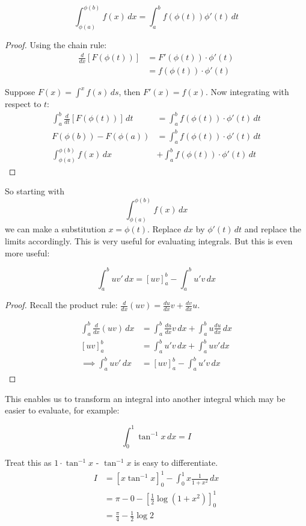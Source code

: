 \documentclass[twoside]{scrartcl}
\begin{document}
\begin{theorem}
 \[\int_{\phi(a)}^{\phi(b)} f(x)\,dx = \int_a^b f(\phi(t))\phi'(t)\,dt\]
\end{theorem}
\begin{proof}
Using the chain rule: 
\[
\begin{aligned}
  \frac{d}{dx}\left[F(\phi(t))\right] &= F'(\phi(t))\cdot\phi'(t)\\
  &= f(\phi(t))\cdot\phi'(t)
\end{aligned}
\]

Suppose $F(x) = \int^x f(s)\,ds$, then $F'(x) = f(x)$. Now integrating with respect to $t$: 
\[
\begin{aligned}
  \int_a^b \frac{d}{dt}\left[F(\phi(t))\right]\,dt &= \int_a^b f(\phi(t))\cdot\phi'(t)\,dt\\
  F(\phi(b)) - F(\phi(a)) &= \int_a^b f(\phi(t))\cdot\phi'(t)\,dt\\
  \int_{\phi(a)}^{\phi(b)} f(x)\,dx &+ \int_a^b f(\phi(t))\cdot\phi'(t)\,dt
\end{aligned}
\]
\end{proof}

So starting with 
\[ \int_{\phi(a)}^{\phi(b)} f(x)\,dx\]
we can make a substitution $x = \phi(t)$. Replace $dx$ by $\phi'(t)\,dt$ and replace the limits accordingly. This is very useful for evaluating integrals. But this is even more useful:\\

\begin{theorem}
\[\int_a^b uv'\,dx = [uv]_a^b - \int_a^bu'v\,dx\]
\end{theorem}
\begin{proof}
	Recall the product rule: $\frac{d}{dx}(uv) = \frac{du}{dx}v + \frac{dv}{dx}u$. 
	
	\[
\begin{aligned}
  \int_a^b \frac{d}{dx}(uv)\,dx &= \int_a^b \frac{du}{dx}v\,dx + \int_a^b u\frac{du}{dx}\,dx\\
  [uv]_a^b &= \int_a^b u'v\,dx + \int_a^b uv'dx\\
 \implies \int_a^b uv'\,dx &= [uv]_a^b - \int_a^b u'v\,dx
\end{aligned}
\]
\end{proof}

This enables us to transform an integral into another integral which may be easier to evaluate, for example:\\

\begin{example}
\[\int_0^1 \tan^{-1}x\,dx = I\]

Treat this as $1\cdot\tan^{-1}x$ - $\tan^{-1}x$ is easy to differentiate. 
\[
\begin{aligned}
  I &= [x\tan^{-1}x]_0^1 - \int_0^1 x \frac{1}{1+x^2}\,dx\\
  &= \pi-0 - \left[\frac{1}{2}\log(1+x^2)\right]_0^1\\
  &= \frac{\pi}{4} - \frac{1}{2}\log 2
\end{aligned}
\]
\end{example}
\end{document}
